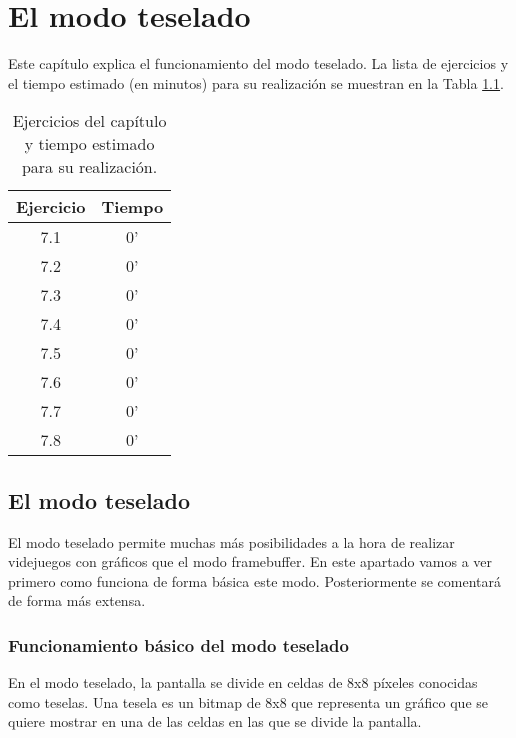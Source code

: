 \chapter{El modo teselado}

Este capítulo explica el funcionamiento del modo teselado. La lista de ejercicios y el tiempo estimado (en minutos) para su realización se muestran en la Tabla \ref{c7_tab:ejercios}.

\begin{table}[t]
	\centering
	\caption{Ejercicios del capítulo y tiempo estimado para su realización.}
	\begin{tabular}{|c|c|}
		\hline 
		Ejercicio & Tiempo \\ 
		\hline 
		7.1 & 0' \\ 
		7.2 & 0' \\ 
		7.3 & 0' \\ 
		7.4 & 0' \\ 
		7.5 & 0' \\ 
		7.6 & 0' \\ 
		7.7 & 0' \\ 
		7.8 & 0' \\ 
		\hline 
	\end{tabular} 
	\label{c7_tab:ejercios}
\end{table}



\section{El modo teselado}
El modo teselado permite muchas más posibilidades a la hora de realizar videjuegos con gráficos que el modo framebuffer. En este apartado vamos a ver primero como funciona de forma básica este modo. Posteriormente se comentará de forma más extensa.

\subsection{Funcionamiento básico del modo teselado}
En el modo teselado, la pantalla se divide en celdas de 8x8 píxeles conocidas como teselas. Una tesela es un bitmap de 8x8 que representa un gráfico que se quiere mostrar en una de las celdas en las que se divide la pantalla. 

